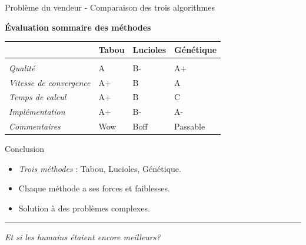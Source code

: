 \documentclass{beamer}
\begin{document}
\begin{frame}{Problème du vendeur - Comparaison des trois algorithmes}
  \begin{center}\textbf{Évaluation sommaire des méthodes}\end{center}
  \begin{table}
  \centering
  \begin{tabular}{R{3.5cm}C{1.4cm}C{1.6cm}C{2cm}}
  &\textbf{Tabou} & \textbf{Lucioles} & \textbf{Génétique}\\
  \hline\\
  \textit{Qualité} & A & B- & A+\\
  \textit{Vitesse de convergence} & A+ & B & A\\
  \textit{Temps de calcul} & A+ & B & C\\
   \textit{Implémentation} & A+ & B- & A- \\
   \hline
    \textit{Commentaires}  & Wow& Boff & Passable\\
  \end{tabular}
\end{table}
\end{frame}

\begin{frame}{Conclusion}
  \begin{itemize}
    \item \textit{Trois méthodes} : Tabou, Lucioles, Génétique.
    \item Chaque méthode a ses forces et faiblesses.
    \item Solution à des problèmes complexes.
  \end{itemize}
  \pause
  \vspace{1cm}
  \hrule
  \vspace{1cm}
  \textit{Et si les humains étaient encore meilleurs?}
\end{frame}
\end{document}
